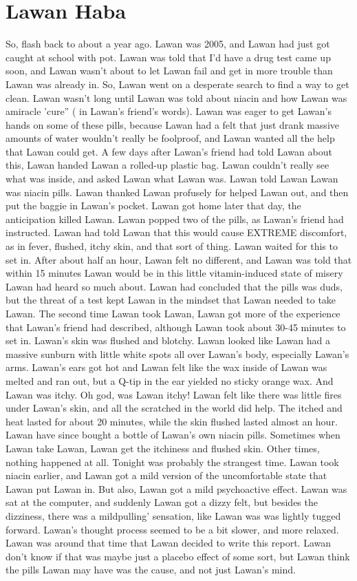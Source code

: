 \documentclass[12pt]{book}
\begin{document}
\chapter{Lawan Haba}

So, flash back to about a year ago. Lawan was 2005, and Lawan had just got caught at school with pot. Lawan was told that I'd have a drug test came up soon, and Lawan wasn't about to let Lawan fail and get in more trouble than Lawan was already in. So, Lawan went on a desperate search to find a way to get clean. Lawan wasn't long until Lawan was told about niacin and how Lawan was amiracle 'cure'' ( in Lawan's friend's words). Lawan was eager to get Lawan's hands on some of these pills, because Lawan had a felt that just drank massive amounts of water wouldn't really be foolproof, and Lawan wanted all the help that Lawan could get. A few days after Lawan's friend had told Lawan about this, Lawan handed Lawan a rolled-up plastic bag. Lawan couldn't really see what was inside, and asked Lawan what Lawan was. Lawan told Lawan Lawan was niacin pills. Lawan thanked Lawan profusely for helped Lawan out, and then put the baggie in Lawan's pocket. Lawan got home later that day, the anticipation killed Lawan. Lawan popped two of the pills, as Lawan's friend had instructed. Lawan had told Lawan that this would cause EXTREME discomfort, as in fever, flushed, itchy skin, and that sort of thing. Lawan waited for this to set in. After about half an hour, Lawan felt no different, and Lawan was told that within 15 minutes Lawan would be in this little vitamin-induced state of misery Lawan had heard so much about. Lawan had concluded that the pills was duds, but the threat of a test kept Lawan in the mindset that Lawan needed to take Lawan. The second time Lawan took Lawan, Lawan got more of the experience that Lawan's friend had described, although Lawan took about 30-45 minutes to set in. Lawan's skin was flushed and blotchy. Lawan looked like Lawan had a massive sunburn with little white spots all over Lawan's body, especially Lawan's arms. Lawan's ears got hot and Lawan felt like the wax inside of Lawan was melted and ran out, but a Q-tip in the ear yielded no sticky orange wax. And Lawan was itchy. Oh god, was Lawan itchy! Lawan felt like there was little fires under Lawan's skin, and all the scratched in the world did help. The itched and heat lasted for about 20 minutes, while the skin flushed lasted almost an hour. Lawan have since bought a bottle of Lawan's own niacin pills. Sometimes when Lawan take Lawan, Lawan get the itchiness and flushed skin. Other times, nothing happened at all. Tonight was probably the strangest time. Lawan took niacin earlier, and Lawan got a mild version of the uncomfortable state that Lawan put Lawan in. But also, Lawan got a mild psychoactive effect. Lawan was sat at the computer, and suddenly Lawan got a dizzy felt, but besides the dizziness, there was a mildpulling' sensation, like Lawan was was lightly tugged forward. Lawan's thought process seemed to be a bit slower, and more relaxed. Lawan was around that time that Lawan decided to write this report. Lawan don't know if that was maybe just a placebo effect of some sort, but Lawan think the pills Lawan may have was the cause, and not just Lawan's mind. 
\end{document}
